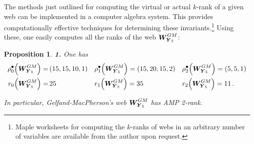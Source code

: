 \documentclass[11pt]{amsart}
\newcommand{\sk}{\smallskip}
\newtheorem{prop}[thm]{Proposition}
\begin{document}
The methods just outlined for computing the virtual or actual $k$-rank of a given web can be implemented in a computer algebra system. This provides computationally effective techniques for determining these invariants.\footnote{Maple worksheets for computing the $k$-ranks of webs in an arbitrary number of variables are available from the author upon request.} Using these, one easily computes all the ranks of the web $\boldsymbol{W}^{GM}_{\hspace{-0.05cm}\boldsymbol{Y}_5}$: 
%
%
\begin{prop}%
\label{Prop:Virtual-Ranks}%
{\bf 1.} One has 
\begin{align*}
\rho^{\bullet}_0\Big( 
\boldsymbol{W}^{GM}_{\hspace{-0.05cm}\boldsymbol{Y}_5}
\Big)
= &  \,   (15,15,10,1)
&&
\rho^{\bullet}_1\Big( 
\boldsymbol{W}^{GM}_{\hspace{-0.05cm}\boldsymbol{Y}_5}
\Big)
= ( 15, 20, 15, 2 )
&& \rho^{\bullet}_2\Big( 
\boldsymbol{W}^{GM}_{\hspace{-0.05cm}\boldsymbol{Y}_5}
\Big)
=  (5,5,1) 
\\
r_0\Big( 
\boldsymbol{W}^{GM}_{\hspace{-0.05cm}\boldsymbol{Y}_5}
\Big)
=  &   \, 25
&&
r_1\Big( 
\boldsymbol{W}^{GM}_{\hspace{-0.05cm}\boldsymbol{Y}_5}
\Big)
=   35 
&& r_2\Big( 
\boldsymbol{W}^{GM}_{\hspace{-0.05cm}\boldsymbol{Y}_5}
\Big)
=   11 \, .
\end{align*}

In particular,  Gelfand-MacPherson's web $\boldsymbol{W}^{GM}_{\hspace{-0.05cm}\boldsymbol{Y}_5}$ has AMP 2-rank. \sk 


\end{prop}
\end{document}
